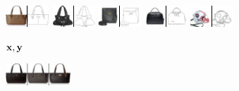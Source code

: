   \clearpage
\newcommand{\edgesstuffimgheight}{0.8cm}
  \begin{figure}[t]
    \centering
    \begin{subfigure}[t]{0.15\textwidth}
      \centering
      \includegraphics[height=\edgesstuffimgheight]{figs/cigcvae/image-samples/bags/image_aipo_0_imagenet_gt_masked.png}
      \includegraphics[height=\edgesstuffimgheight]{figs/cigcvae/image-samples/bags/image_aipo_1_imagenet_gt_masked.png}
      \includegraphics[height=\edgesstuffimgheight]{figs/cigcvae/image-samples/bags/image_aipo_2_imagenet_gt_masked.png}
      \includegraphics[height=\edgesstuffimgheight]{figs/cigcvae/image-samples/bags/image_aipo_3_imagenet_gt_masked.png}
      \includegraphics[height=\edgesstuffimgheight]{figs/cigcvae/image-samples/bags/image_aipo_4_imagenet_gt_masked.png}
      \caption{${\mathbf{x}}, {\mathbf{y}}$}
    \end{subfigure}
    \begin{subfigure}[t]{0.27\textwidth}
      \centering
      \includegraphics[height=\edgesstuffimgheight]{figs/cigcvae/image-samples/bags/image_aipo_0_t=0.85_imagenet_samples.png}

\end{subfigure}
\end{figure}

